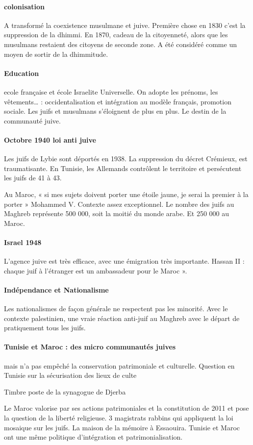 \paragraph{colonisation} A transformé la coexistence musulmane et juive. Première chose en 1830 c’est la suppression de la dhimmi. En 1870, cadeau de la citoyenneté, alors que les musulmans restaient des citoyens de seconde zone.  A été considéré comme un moyen de sortir de la dhimmitude.

\paragraph{Education} ecole française et école Israelite Universelle. On adopte les prénoms, les vêtements… : occidentalisation et intégration au modèle français, promotion sociale.  Les juifs et musulmans s’éloignent de plus en plus.  Le destin de la communauté juive. 
\paragraph{Octobre 1940 loi anti juive} Les juifs de Lybie sont déportés en 1938. La suppression du décret Crémieux, est traumatisante. En Tunisie, les Allemands contrôlent le territoire et persécutent les juifs de 41 à 43.

Au Maroc, « si mes sujets doivent porter une étoile jaune, je serai la premier à la porter » Mohammed V. Contexte assez exceptionnel. Le nombre des juifs au Maghreb représente 500 000, soit la moitié du monde arabe. Et 250 000 au Maroc.
\paragraph{Israel 1948} L’agence juive est très efficace, avec une émigration très importante. Hassan II : chaque juif à l’étranger est un ambassadeur pour le Maroc ». 

\paragraph{Indépendance et Nationalisme} Les nationalismes de façon générale ne respectent pas les minorité. Avec le contexte palestinien, une vraie réaction anti-juif au Maghreb avec le départ de pratiquement tous les juifs. 

\paragraph{Tunisie et Maroc : des micro communautés juives} mais n’a pas empêché la conservation patrimoniale et culturelle. Question en Tunisie sur la sécurisation des lieux de culte
\begin{Ex}
Timbre poste de la synagogue de Djerba
\end{Ex}
Le Maroc valorise par ses actions patrimoniales et la constitution de 2011 et pose la question de la liberté religieuse. 3 magistrats rabbins qui appliquent la loi mosaique sur les juifs. La maison de la mémoire à Essaouira. Tunisie et Maroc ont une même politique d’intégration et patrimonialisation.

